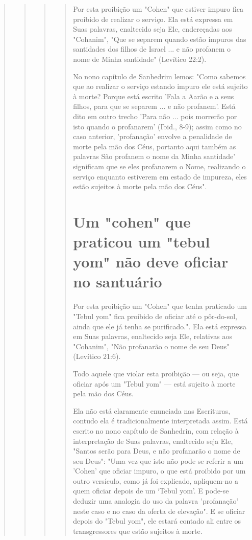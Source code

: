\begin{quote}
\begin{quote}
\begin{quote}
\begin{quote}
Por esta proibição um "Cohen" que estiver impuro fica proibido de
realizar o serviço. Ela está expressa em Suas palavras, enaltecido seja
Ele, ende­reçadas aos "Cohanim", "Que se separem quando estão impuros
das santida­des dos filhos de Israel ... e não profanem o nome de Minha
santidade" (Levíti­co 22:2).

No nono capítulo de Sanhedrim lemos: "Como sabemos que ao rea­lizar o
serviço estando impuro ele está sujeito à morte? Porque está escrito
'Fa­la a Aarão e a seus filhos, para que se separem ... e não profanem'.
Está dito em outro trecho 'Para não ... pois morrerão por isto quando o
profanarem' (Ibid., 8-9); assim como no caso anterior, 'profanação'
envolve a penalidade de morte pela mão dos Céus, portanto aqui também as
palavras São profanem o nome da Minha santidade' significam que se eles
profanarem o Nome, realizando o serviço enquanto estiverem em estado de
impureza, eles estão sujeitos à morte pela mão dos Céus".

\section{Um "cohen" que praticou um "tebul yom" não deve oficiar no santuário}

Por esta proibição um "Cohen" que tenha praticado um "Tebul yom" fica
proibido de oficiar até o pôr-do-sol, ainda que ele já tenha se
purificado.". Ela está expressa em Suas palavras,
enaltecido seja Ele, relativas aos "Cohanim", "Não profanarão o nome de
seu Deus" (Levítico 21:6).

Todo aquele que violar esta proibição --- ou seja, que oficiar após um
"Tebul yom" --- está sujeito à morte pela mão dos Céus.

Ela não está claramente enunciada nas Escrituras, contudo ela é
tra­dicionalmente interpretada assim. Está escrito no nono capítulo de
Sanhedrin, com relação à interpretação de Suas palavras, enaltecido seja
Ele, "Santos serão
para Deus, e não profanarão o nome de seu Deus": "Uma vez que isto não
po­de se referir a um 'Cohen' que oficiar impuro, o que está proibido
por um ou­tro versículo, como já foi explicado, apliquem-no a quem
oficiar depois de um `Tebul yom'. E pode-se deduzir uma analogia do uso
da palavra 'profanação' neste caso e no caso da oferta de elevação". E
se oficiar depois do "Tebul yom", ele estará contado ali entre os
transgressores que estão sujeitos à morte.
\end{quote}


\end{quote}
\end{quote}
\end{quote}
